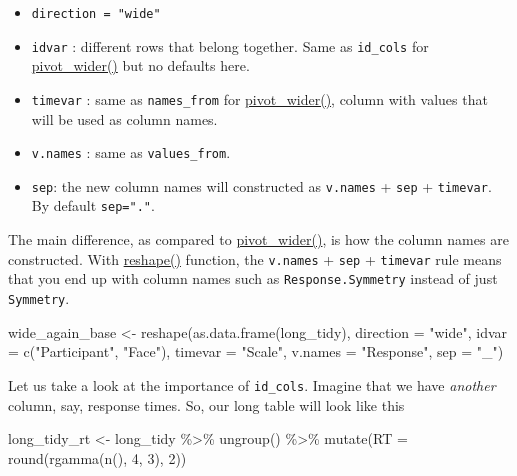 \documentclass[
]{book}
\newenvironment{Shaded}{\begin{snugshade}}{\end{snugshade}}
\newcommand{\AttributeTok}[1]{\textcolor[rgb]{0.77,0.63,0.00}{#1}}
\newcommand{\DecValTok}[1]{\textcolor[rgb]{0.00,0.00,0.81}{#1}}
\newcommand{\FunctionTok}[1]{\textcolor[rgb]{0.00,0.00,0.00}{#1}}
\newcommand{\NormalTok}[1]{#1}
\newcommand{\OtherTok}[1]{\textcolor[rgb]{0.56,0.35,0.01}{#1}}
\newcommand{\SpecialCharTok}[1]{\textcolor[rgb]{0.00,0.00,0.00}{#1}}
\newcommand{\StringTok}[1]{\textcolor[rgb]{0.31,0.60,0.02}{#1}}
\providecommand{\tightlist}{%
  \setlength{\itemsep}{0pt}\setlength{\parskip}{0pt}}
\begin{document}
\begin{itemize}
\tightlist
\item
  \texttt{direction\ =\ "wide"}
\item
  \texttt{idvar} : different rows that belong together. Same as \texttt{id\_cols} for \href{https://tidyr.tidyverse.org/reference/pivot_wider.html}{pivot\_wider()} but no defaults here.
\item
  \texttt{timevar} : same as \texttt{names\_from} for \href{https://tidyr.tidyverse.org/reference/pivot_wider.html}{pivot\_wider()}, column with values that will be used as column names.
\item
  \texttt{v.names} : same as \texttt{values\_from}.
\item
  \texttt{sep}: the new column names will constructed as \texttt{v.names} + \texttt{sep} + \texttt{timevar}. By default \texttt{sep="."}.
\end{itemize}

The main difference, as compared to \href{https://tidyr.tidyverse.org/reference/pivot_wider.html}{pivot\_wider()}, is how the column names are constructed. With \href{https://stat.ethz.ch/R-manual/R-patched/library/stats/html/reshape.html}{reshape()} function, the \texttt{v.names} + \texttt{sep} + \texttt{timevar} rule means that you end up with column names such as \texttt{Response.Symmetry} instead of just \texttt{Symmetry}.

\begin{Shaded}
\begin{Highlighting}[]
\NormalTok{wide\_again\_base }\OtherTok{\textless{}{-}} \FunctionTok{reshape}\NormalTok{(}\FunctionTok{as.data.frame}\NormalTok{(long\_tidy),}
                           \AttributeTok{direction =} \StringTok{"wide"}\NormalTok{,}
                           \AttributeTok{idvar =} \FunctionTok{c}\NormalTok{(}\StringTok{"Participant"}\NormalTok{, }\StringTok{"Face"}\NormalTok{),}
                           \AttributeTok{timevar =} \StringTok{"Scale"}\NormalTok{,}
                           \AttributeTok{v.names =} \StringTok{"Response"}\NormalTok{,}
                           \AttributeTok{sep =} \StringTok{"\_"}\NormalTok{)}
\end{Highlighting}
\end{Shaded}

Let us take a look at the importance of \texttt{id\_cols}. Imagine that we have \emph{another} column, say, response times. So, our long table will look like this

\begin{Shaded}
\begin{Highlighting}[]
\NormalTok{long\_tidy\_rt }\OtherTok{\textless{}{-}}
\NormalTok{  long\_tidy }\SpecialCharTok{\%\textgreater{}\%}
  \FunctionTok{ungroup}\NormalTok{() }\SpecialCharTok{\%\textgreater{}\%}
  \FunctionTok{mutate}\NormalTok{(}\AttributeTok{RT =} \FunctionTok{round}\NormalTok{(}\FunctionTok{rgamma}\NormalTok{(}\FunctionTok{n}\NormalTok{(), }\DecValTok{4}\NormalTok{, }\DecValTok{3}\NormalTok{), }\DecValTok{2}\NormalTok{))}
\end{Highlighting}
\end{Shaded}
\end{document}
